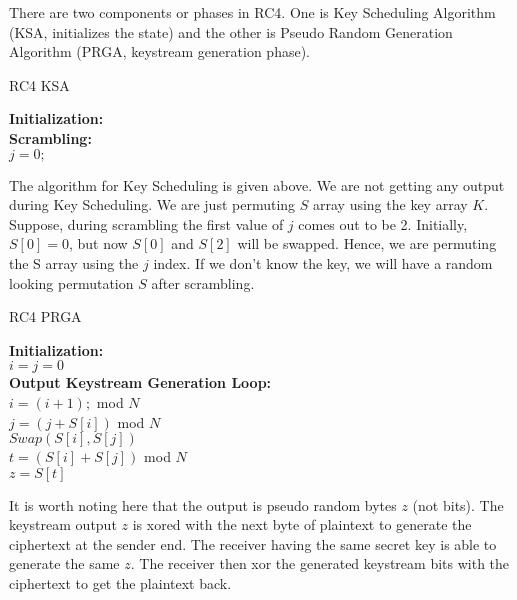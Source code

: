 \documentclass[11pt]{article}
\begin{document}
There are two components or phases in RC4. One is Key Scheduling Algorithm (KSA, initializes the state)  and the other is Pseudo Random Generation Algorithm (PRGA, keystream generation phase).
\begin{center}
    \begin{algorithm}
    \caption{RC4 KSA}
        \textbf{Initialization:}\\
        \textbf{Scrambling:}\\
        $j = 0;$\\
    \end{algorithm}
\end{center}
The algorithm for Key Scheduling is given above. We are not getting any output during Key Scheduling. We are just permuting $S$ array using the key array $K$. Suppose, during scrambling the first value of $j$ comes out to be 2. Initially, $S[0] = 0$, but now $S[0]$ and $S[2]$ will be swapped. Hence, we are permuting the S array using the $j$ index. If we don't know the key, we will have a random looking permutation $S$ after scrambling.

\begin{center}
    \begin{algorithm}
    \caption{RC4 PRGA}
        \textbf{Initialization:}\\
        $i = j = 0$\\
        \textbf{Output Keystream Generation Loop:}\\
        $i = (i + 1);$ mod $N$\\
        $j = (j + S[i]) $ mod $N$\\
        $Swap(S[i], S[j])$\\
        $t = (S[i] + S[j])$ mod $N$\\
        $z = S[t]$\\
        
    \end{algorithm}
\end{center}
It is worth noting here that the output is pseudo random bytes $z$ (not bits). The keystream output $z$ is xored with the next byte of plaintext to generate the ciphertext at the sender end. The receiver having the same secret key is able to generate the same $z$. The receiver then xor the generated keystream bits with the ciphertext to get the plaintext back.
\end{document}
